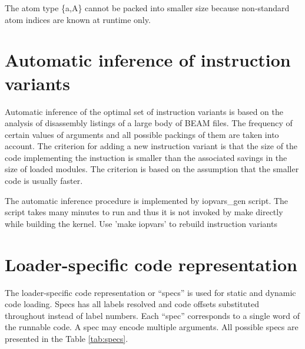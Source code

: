 \documentclass{article}
\begin{document}
The atom type \{a,A\} cannot be packed into smaller size because non-standard
atom indices are known at runtime only.

\section*{Automatic inference of instruction variants}

Automatic inference of the optimal set of instruction variants is based on the
analysis of disassembly listings of a large body of BEAM files. The frequency of
certain values of arguments and all possible packings of them are taken into
account. The criterion for adding a new instruction variant is that the size of
the code implementing the instuction is smaller than the associated savings in
the size of loaded modules. The criterion is based on the assumption that the
smaller code is usually faster.

The automatic inference procedure is implemented by iopvars\_gen script. The
script takes many minutes to run and thus it is not invoked by make directly
while building the kernel. Use 'make iopvars' to rebuild instruction variants

\section*{Loader-specific code representation}

The loader-specific code representation or ``specs'' is used for static and
dynamic code loading. Specs has all labels resolved and code offsets substituted
throughout instead of label numbers. Each ``spec'' corresponds to a single word
of the runnable code. A spec may encode multiple arguments. All possible specs
are presented in the Table \ref{tab:specs}.
\end{document}
